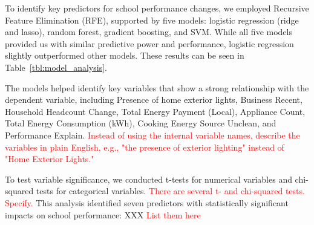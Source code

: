 \documentclass[journal=jacsat,manuscript=article]{achemso}
\begin{document}
To identify key predictors for school performance changes, we employed Recursive Feature Elimination (RFE), supported by five models: logistic regression (ridge and lasso), random forest, gradient boosting, and SVM. While all five models provided us with similar predictive power and performance, logistic regression slightly outperformed other models. These results can be seen in Table~\ref{tbl:model_analysis}.
\begin{center}
\begin{table}
    \caption{Model Analysis}
    \label{tbl:model_analysis}
\end{table}
\end{center}
The models helped identify key variables that show a strong relationship with the dependent variable, including Presence of home exterior lights, Business Recent, Household Headcount Change, Total Energy Payment (Local), Appliance Count, Total Energy Consumption (kWh), Cooking Energy Source Unclean, and Performance Explain. \textcolor{red}{Instead of using the internal variable names, describe the variables in plain English, e.g., "the presence of exterior lighting" instead of "Home Exterior Lights."}

To test variable significance, we conducted t-tests for numerical variables and chi-squared tests for categorical variables. \textcolor{red}{There are several t- and chi-squared tests. Specify.} This analysis identified seven predictors with statistically significant impacts on school performance: XXX \textcolor{red}{List them here}
\end{document}
